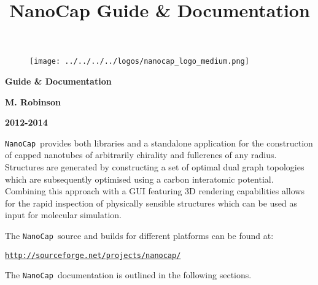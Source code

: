 \documentclass{article}
\title{NanoCap Guide \& Documentation}
\date{}
\newcommand{\nanocap}{\texttt{NanoCap}}
\begin{document}
\begin{figure}[h!]
\centering
\texttt{[image: ../../../../logos/nanocap\_logo\_medium.png]}
\end{figure}
\begin{center}\large\textbf{Guide \& Documentation}\end{center}
\begin{center}\normalsize\textbf{M. Robinson }\end{center}
\begin{center}\small\textbf{2012-2014}\end{center}
\normalsize{}



\nanocap~provides both libraries and a standalone application for the construction 
of capped nanotubes of arbitrarily chirality and fullerenes of any radius. Structures 
are generated by constructing a set of optimal dual graph topologies which 
are subsequently optimised using a carbon interatomic potential. Combining 
this approach with a GUI featuring 3D rendering capabilities allows for the rapid 
inspection of physically sensible structures which can be used as input for 
molecular simulation.

The \nanocap~source and builds for different platforms can be found at:

\href{http://sourceforge.net/projects/nanocap/}{\texttt{http://sourceforge.net/projects/nanocap/}}

The \nanocap~documentation is outlined in the following sections.

\tableofcontents





\end{document}

